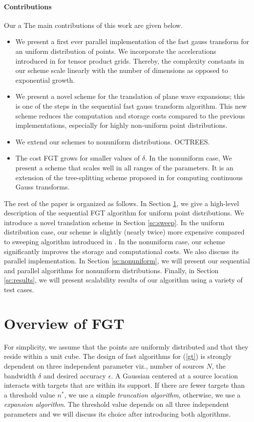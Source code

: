 \documentclass[conference]{IEEEtran}
\begin{document}
\paragraph{Contributions} Our a
The main contributions of this work are given below.
\begin{itemize} 
%
\item We present a first ever parallel implementation of the fast gauss transform for an 
uniform distribution of points. We incorporate the accelerations introduced in \cite{fggt} for tensor product grids. 
Thereby, the complexity constants in our scheme scale linearly with the number of dimensions 
as opposed to exponential growth. 
%
\item We present a novel scheme for the translation of plane wave expansions; this is one
of the steps in the sequential fast gauss transform algorithm. This new scheme reduces the 
computation and storage costs compared to the previous implementations, especially for highly
non-uniform point distributions.
%
\item We extend our schemes to nonuniform distributions. OCTREES.

\item The cost FGT grows for smaller values of $\delta$. In the nonuniform case, 
We present a scheme that scales well in all ranges of the parameters. It is an extension of the tree-splitting scheme proposed in \cite{veerapaneni08} for computing continuous Gauss transforms. 
%
\end{itemize}

The rest of the paper is organized as follows. In Section \ref{sc:fgt}, we give a high-level description of the sequential FGT algorithm for uniform point distributions. We introduce a novel translation scheme in Section \ref{sc:sweep}. In the uniform distribution case, our scheme is slightly (nearly twice) more expensive compared to sweeping algorithm introduced in \cite{greengard98}. In the nonuniform case, our scheme significantly improves the storage and computational costs. We also discuss its parallel implementation. In Section \ref{sc:nonuniform}, we will present our sequential and parallel algorithms for nonuniform distributions. Finally, in Section \ref{sc:results}, we will present scalability results of our algorithm using a variety of test cases. 

\section{Overview of FGT} 
\label{sc:fgt}
For simplicity, we assume that the points are uniformly distributed and that they reside within a unit cube.
The design of fast algorithms for (\ref{gt}) is strongly dependent on three independent parameter viz., number of sources $N$, the bandwidth $\delta$ and desired accuracy $\epsilon$. A Gaussian centered at a source location interacts with targets that are within its support. If there are fewer targets than a threshold value $n^*$, we use a simple {\em truncation algorithm}, otherwise, we use a {\em expansion algorithm}. The threshold  value depends on all three independent parameters and we will discuss its choice after introducing both algorithms. 
\end{document}
